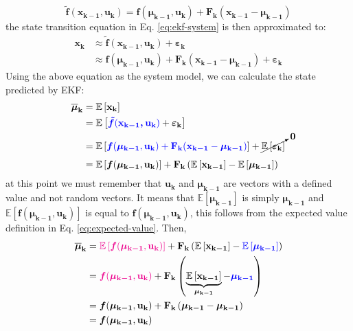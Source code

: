 \documentclass[12pt]{article}
\newcommand{\bvec}[1]{\boldsymbol{\mathbf{#1}}} %
\newcommand{\mat}[1]{\boldsymbol{\mathbf{#1}}}
\newcommand{\brac}[1]{\left[#1\right]} %
\newcommand{\parentheses}[1]{\left(#1\right)}
\newcommand{\mb}[1]{{\boldsymbol{#1}}} %
\newcommand{\expv}[1]{\mathbb{E}\brac{#1}} %
\newcommand{\blue}[1]{\color{blue}#1\color{black}}
\newcommand{\magenta}[1]{\color{magenta}#1\color{black}}
\begin{document}
\begin{equation}
    \mb{\tilde{f}}(\bvec{x_{k-1}, u_k}) = 
    \mb{f}(\bvec{\mu_{k-1}}, \bvec{u_k}) 
    + \mat{F_k} (\bvec{x_{k-1}} - \bvec{\mu_{k-1}})
    \label{eq:linearized-system-model}
\end{equation}
the state transition equation in Eq. \ref{eq:ekf-system} is then 
approximated to:
\begin{equation}
\begin{aligned}
    \bvec{x_k} &\approx \mb{\tilde{f}}(\bvec{x_{k-1}, u_k}) 
    + \bvec{\varepsilon_k}\\
    &\approx \mb{f}(\bvec{\mu_{k-1}}, \bvec{u_k}) + \mat{F_k} (\bvec{x_{k-1}} - 
    \bvec{\mu_{k-1}}) + \bvec{\varepsilon_k}
\end{aligned}
\end{equation}
Using the above equation as the system model, we can calculate the state
predicted by EKF:
\begin{equation*}
\begin{aligned}
    \bvec{\overline{\mu}_k} &= \expv{\bvec{x_k}} \\
    &= \expv{\blue{\mb{\tilde{f}}(\bvec{x_{k-1}, u_k})} + \mb{\varepsilon}_\mathbf{k}}\\
    &= \expv{\blue{\mb{f}(\bvec{\mu_{k-1}}, \bvec{u_k}) + \mat{F_k} (\bvec{x_{k-1}} - \bvec{\mu_{k-1}})}} + \cancelto{\bvec{0}}{\expv{\mb{\varepsilon}_\mathbf{k}}} \\
    &= \expv{\mb{f}(\bvec{\mu_{k-1}}, \bvec{u_k})} + \mat{F_k}\parentheses{\expv{\bvec{x_{k-1}}} - \expv{\bvec{\mu_{k-1}}}}
\end{aligned}
\end{equation*}
at this point we must remember that $\bvec{u_k}$ and $\bvec{\mu_{k-1}}$ 
are vectors with a defined value and not random vectors. It means that 
$\expv{\bvec{\mu_{k-1}}}$ is simply $\bvec{\mu_{k-1}}$ and 
$\expv{\mb{f}\parentheses{\bvec{\mu_{k-1}}, \bvec{u_k}}}$ is equal to $\mb{f}\parentheses{\bvec{\mu_{k-1}}, \bvec{u_k}}$, this follows from the expected value definition in Eq. \ref{eq:expected-value}. Then,
\begin{equation}
    \begin{aligned}
        \bvec{\overline{\mu}_k} &= \magenta{\expv{\mb{f}(\bvec{\mu_{k-1}}, \bvec{u_k})}} + \mat{F_k}\parentheses{\expv{\bvec{x_{k-1}}} - \blue{\expv{\bvec{\mu_{k-1}}}}}\\
        &= \magenta{\mb{f}(\bvec{\mu_{k-1}}, \bvec{u_k})} + \mat{F_k}\parentheses{\underbrace{\expv{\bvec{x_{k-1}}}}_{\bvec{\mu_{k-1}}} - \blue{\bvec{\mu_{k-1}}}}\\
        &= \mb{f}(\bvec{\mu_{k-1}}, \bvec{u_k}) + \mat{F_k}\parentheses{\bvec{\mu_{k-1}} - \bvec{\mu_{k-1}}}\\
        &= \mb{f}(\bvec{\mu_{k-1}}, \bvec{u_k})
    \end{aligned}
\label{eq:ekf-mean-prediction}
\end{equation}
\end{document}
